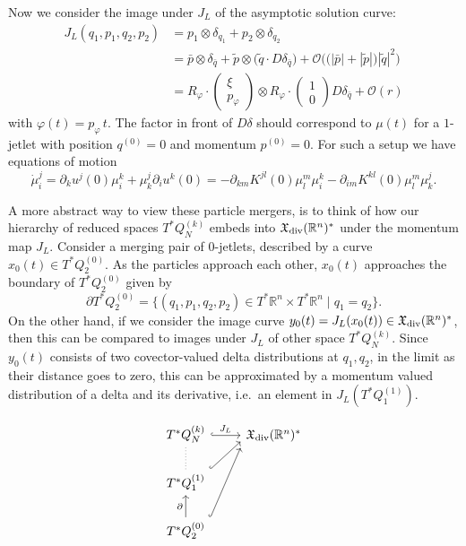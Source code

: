 \documentclass[a4paper,11pt]{article}
\newcommand{\R}{\ensuremath{\mathbb{R}}}
\begin{document}
Now we consider the image under $J_L$ of the asymptotic solution
curve:
\begin{align*}
  J_L(q_1,p_1,q_2,p_2)
  &= p_1 \otimes \delta_{q_1} + p_2 \otimes \delta_{q_2} \\
  &= \bar{p} \otimes \delta_{\bar{q}}
    +\tilde{p} \otimes \big(\tilde{q} \cdot D\delta_{\bar{q}}\big)
    +\mathcal{O}\Big(\big(|\bar{p}|+|\tilde{p}|\big)|\tilde{q}|^2\Big) \\
  &= R_\varphi \cdot \begin{pmatrix} \xi \\ p_\varphi \end{pmatrix} \otimes
     R_\varphi \cdot \begin{pmatrix} 1 \\ 0 \end{pmatrix} D\delta_{\bar{q}}
    +\mathcal{O}(r)
\end{align*}
with $\varphi(t) = p_\varphi\,t$. The factor in front of $D\delta$
should correspond to $\mu(t)$ for a $1$-jetlet with position
$q^{(0)} = 0$ and momentum $p^{(0)} = 0$. For such a setup we have
equations of motion
\begin{equation}
  \dot{\mu}_i^j
  = \partial_k u^j(0) \mu_i^k + \mu_k^j \partial_i u^k(0)
  = -\partial_{km} K^{jl}(0) \mu_l^m \mu_i^k
    -\partial_{im} K^{kl}(0) \mu_l^m \mu_k^j.
\end{equation}


\clearpage

A more abstract way to view these particle mergers, is to think of how
our hierarchy of reduced spaces $T^*Q_N^{(k)}$ embeds into
$\mathfrak{X}_{\rm div}(\R^n)^*$ under the momentum map $J_L$.
Consider a merging pair of $0$-jetlets, described by a curve
$x_0(t) \in T^*Q_2^{(0)}$. As the particles approach each other,
$x_0(t)$ approaches the boundary of $T^*Q_2^{(0)}$ given by
\begin{equation}\label{eq:boundary}
  \partial T^*Q_2^{(0)}
  = \{ (q_1,p_1,q_2,p_2) \in T^* \R^n \times T^* \R^n \mid q_1 = q_2 \}.
\end{equation}
On the other hand, if we consider the image curve
$y_0(t) = J_L(x_0(t)) \in \mathfrak{X}_{\rm div}(\R^n)^*$, then this
can be compared to images under $J_L$ of other space $T^*Q_N^{(k)}$.
Since $y_0(t)$ consists of two covector-valued delta distributions at
$q_1,q_2$, in the limit as their distance goes to zero, this can be
approximated by a momentum valued distribution of a delta and its
derivative, i.e.~an element in $J_L(T^*Q_1^{(1)})$.

\begin{equation}
  \begin{tikzcd}
    T^*Q_N^{(k)} \ar[to=1-2,hook, "J_L"] & \mathfrak{X}_{\rm div}(\R^n)^* \\
    T^*Q_1^{(1)} \ar[to=1-2,hook,start anchor=north east,end anchor={[yshift=-0.5em]west}]
                 \ar[u,dotted,no head] &  \\
    T^*Q_2^{(0)} \ar[to=1-2,hook,start anchor=north east,end anchor={[yshift=-1.0em]west}]
                 \ar[u,"\partial"] &
  \end{tikzcd}
\end{equation}
\end{document}

